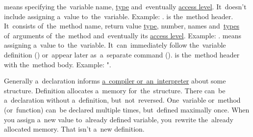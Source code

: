 \label{declarationdefinition}
\begin{itemize}
     means specifying the~variable name, \hyperref[datatypes]{type} and~eventually \hyperref[javaaccessmodifiers]{access level}.
            It~doesn't include assigning a~value to~the~variable.
            Example: .
     is the~method header.
            It~consists of~the~method name, return value \hyperref[datatypes]{type}, number, names and~\hyperref[datatypes]{types} of~arguments of~the~method and~eventually its \hyperref[javaaccessmodifiers]{access level}.
            Example: .
     means assigning a~value to~the~variable.
            It~can~immediately follow the~variable definition () or~appear later as~a~separate command ().
     is the~method header with the~method body.
            Example: ".
\end{itemize}
\newpage

\noindent Generally a~declaration informs \hyperref[compiledinterpretedlanguages]{a~compiler or~an~interpreter} about some structure.
Definition allocates a~memory for~the~structure.
There can~be a~declaration without a~definition, but~not~reversed.
One~variable or~method (or~function) can~be declared multiple times, but~defined maximally once.
When you assign a~new value to~already defined variable, you~rewrite the~already allocated memory.
That isn't a~new definition.
